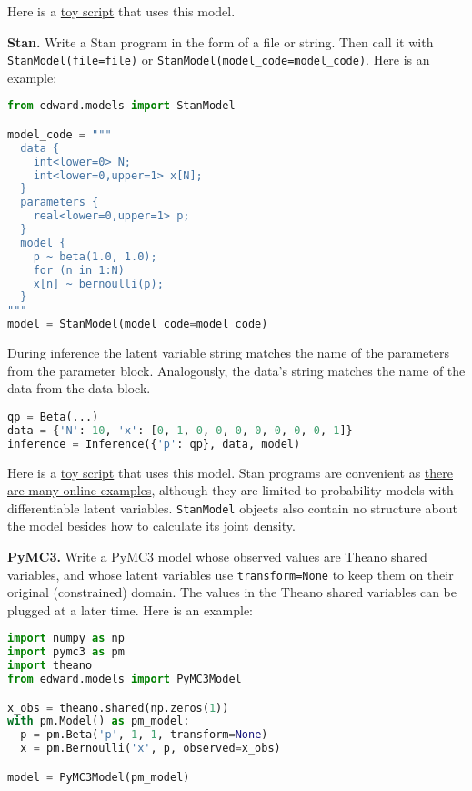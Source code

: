 Here is a
\href{https://github.com/blei-lab/edward/blob/master/examples/np_beta_bernoulli.py}
{toy script}
that uses this model.

\textbf{Stan.}
Write a Stan program in the form of a file or string. Then
call it with \texttt{StanModel(file=file)} or
\texttt{StanModel(model_code=model_code)}. Here is an example:

\begin{lstlisting}[language=Python]
from edward.models import StanModel

model_code = """
  data {
    int<lower=0> N;
    int<lower=0,upper=1> x[N];
  }
  parameters {
    real<lower=0,upper=1> p;
  }
  model {
    p ~ beta(1.0, 1.0);
    for (n in 1:N)
    x[n] ~ bernoulli(p);
  }
"""
model = StanModel(model_code=model_code)
\end{lstlisting}

During inference the latent variable string matches the name of the
parameters from the parameter block. Analogously, the data's string
matches the name of the data from the data block.

\begin{lstlisting}[language=Python]
qp = Beta(...)
data = {'N': 10, 'x': [0, 1, 0, 0, 0, 0, 0, 0, 0, 1]}
inference = Inference({'p': qp}, data, model)
\end{lstlisting}

Here is a
\href{https://github.com/blei-lab/edward/blob/master/examples/stan_beta_bernoulli.py}
{toy script}
that uses this model. Stan programs are convenient as
\href{https://github.com/stan-dev/example-models/wiki}
{there are many online examples},
although they are limited to probability models with differentiable
latent variables. \texttt{StanModel} objects also contain no structure about
the model besides how to calculate its joint density.

\textbf{PyMC3.}
Write a PyMC3 model whose observed values are Theano shared variables,
and whose latent variables use \texttt{transform=None} to keep them on their
original (constrained) domain.
The values in the Theano shared variables can be plugged at a later
time. Here is an example:

\begin{lstlisting}[language=Python]
import numpy as np
import pymc3 as pm
import theano
from edward.models import PyMC3Model

x_obs = theano.shared(np.zeros(1))
with pm.Model() as pm_model:
  p = pm.Beta('p', 1, 1, transform=None)
  x = pm.Bernoulli('x', p, observed=x_obs)

model = PyMC3Model(pm_model)
\end{lstlisting}

